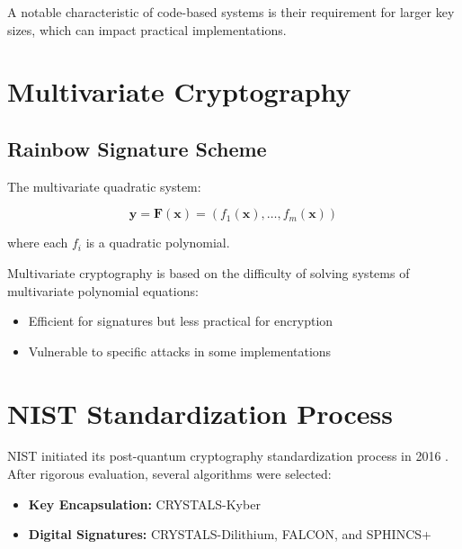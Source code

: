 A notable characteristic of code-based systems is their requirement for larger key sizes, which can impact practical implementations.

\section{Multivariate Cryptography}\label{sec:multivariate}

\subsection{Rainbow Signature Scheme}\label{subsec:rainbow}
The multivariate quadratic system:

\begin{equation}\label{eq:rainbow}
    \mathbf{y} = \mathbf{F}(\mathbf{x}) = (f_1(\mathbf{x}), \ldots, f_m(\mathbf{x}))
\end{equation}

where each $f_i$ is a quadratic polynomial.

Multivariate cryptography is based on the difficulty of solving systems of multivariate polynomial equations:

\begin{itemize}
    \item Efficient for signatures but less practical for encryption
    \item Vulnerable to specific attacks in some implementations
\end{itemize}

\section{NIST Standardization Process}
NIST initiated its post-quantum cryptography standardization process in 2016 \parencite{alagic2020status}. After rigorous evaluation, several algorithms were selected:

\begin{itemize}
    \item \textbf{Key Encapsulation:} CRYSTALS-Kyber
    \item \textbf{Digital Signatures:} CRYSTALS-Dilithium, FALCON, and SPHINCS+
\end{itemize}


